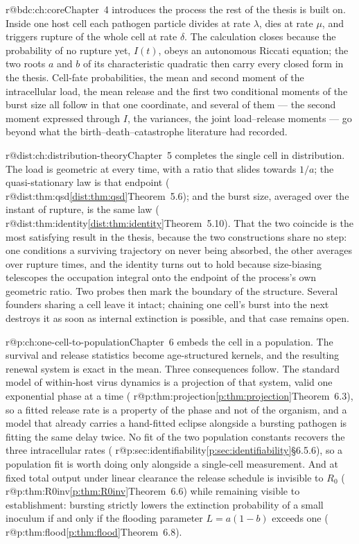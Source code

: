 \documentclass[11pt,a4paper]{report}
\makeatletter
\providecommand{\mextref}[2]{%
  \ifcsname r@#1\endcsname\cref{#1}\else#2\fi}
\providecommand{\Mextref}[2]{%
  \ifcsname r@#1\endcsname\Cref{#1}\else#2\fi}
\theoremstyle{plain}
\theoremstyle{remark}
\makeatother
\begin{document}
\Mextref{bdc:ch:core}{Chapter~4} introduces the process the rest of the
thesis is built on. Inside one host cell each pathogen particle divides at
rate $\lambda$, dies at rate $\mu$, and triggers rupture of the whole cell at
rate $\delta$. The calculation closes because the probability of no rupture
yet, $I(t)$, obeys an autonomous Riccati equation; the two roots $a$ and $b$
of its characteristic quadratic then carry every closed form in the thesis.
Cell-fate probabilities, the mean and second moment of the intracellular
load, the mean release and the first two conditional moments of the burst
size all follow in that one coordinate, and several of them --- the second
moment expressed through $I$, the variances, the joint load--release moments
--- go beyond what the birth--death--catastrophe literature had recorded.

\Mextref{dist:ch:distribution-theory}{Chapter~5} completes the single cell in
distribution. The load is geometric at every time, with a ratio that slides
towards $1/a$; the quasi-stationary law is that endpoint
(\mextref{dist:thm:qsd}{Theorem~5.6}); and the burst size, averaged over the
instant of rupture, is the same law
(\mextref{dist:thm:identity}{Theorem~5.10}). That the two coincide is the most
satisfying result in the thesis, because the two constructions share no step:
one conditions a surviving trajectory on never being absorbed, the other
averages over rupture times, and the identity turns out to hold because
size-biasing telescopes the occupation integral onto the endpoint of the
process's own geometric ratio. Two probes then mark the boundary of the
structure. Several founders sharing a cell leave it intact; chaining one
cell's burst into the next destroys it as soon as internal extinction is
possible, and that case remains open.

\Mextref{p:ch:one-cell-to-population}{Chapter~6} embeds the cell in a
population. The survival and release statistics become age-structured
kernels, and the resulting renewal system is exact in the mean. Three
consequences follow. The standard model of within-host virus dynamics is a
projection of that system, valid one exponential phase at a time
(\mextref{p:thm:projection}{Theorem~6.3}), so a fitted release rate is a
property of the phase and not of the organism, and a model that already
carries a hand-fitted eclipse alongside a bursting pathogen is fitting the
same delay twice. No fit of the two population constants recovers the three
intracellular rates (\mextref{p:sec:identifiability}{\S6.5.6}), so a
population fit is worth doing only alongside a single-cell measurement.
And at fixed total output under linear clearance the release schedule is
invisible to $R_0$ (\mextref{p:thm:R0inv}{Theorem~6.6}) while remaining
visible to establishment: bursting strictly lowers the extinction
probability of a small inoculum if and only if the flooding parameter
$L=a(1-b)$ exceeds one (\mextref{p:thm:flood}{Theorem~6.8}).
\end{document}
